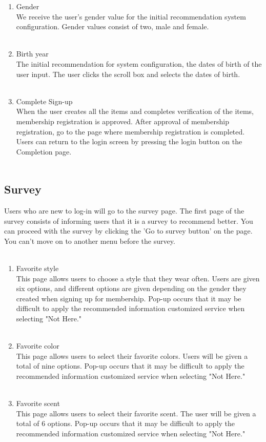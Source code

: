\documentclass[conference]{IEEEtran}
\begin{document}
\begin{enumerate}
    \item Gender \\
        We receive the user's gender value for the initial recommendation system configuration. Gender values consist of two, male and female. \\ \\
    \item Birth year \\
        The initial recommendation for system configuration, the dates of birth of the user input. The user clicks the scroll box and selects the dates of birth. \\ \\
    \item Complete Sign-up \\
        When the user creates all the items and completes verification of the items, membership registration is approved. After approval of membership registration, go to the page where membership registration is completed. Users can return to the login screen by pressing the login button on the Completion page. \\ \\
\end{enumerate}

\subsection{Survey}
Users who are new to log-in will go to the survey page. The first page of the survey consists of informing users that it is a survey to recommend better. You can proceed with the survey by clicking the 'Go to survey button' on the page. You can't move on to another menu before the survey. \\ \\
\begin{enumerate}
    \item Favorite style\\
        This page allows users to choose a style that they wear often. Users are given six options, and different options are given depending on the gender they created when signing up for membership. Pop-up occurs that it may be difficult to apply the recommended information customized service when selecting "Not Here."  \\ \\
    \item Favorite color\\
        This page allows users to select their favorite colors. Users will be given a total of nine options. Pop-up occurs that it may be difficult to apply the recommended information customized service when selecting "Not Here." \\ \\
    \item Favorite scent\\
        This page allows users to select their favorite scent. The user will be given a total of 6 options. Pop-up occurs that it may be difficult to apply the recommended information customized service when selecting "Not Here." \\ \\
\end{enumerate}
\end{document}
